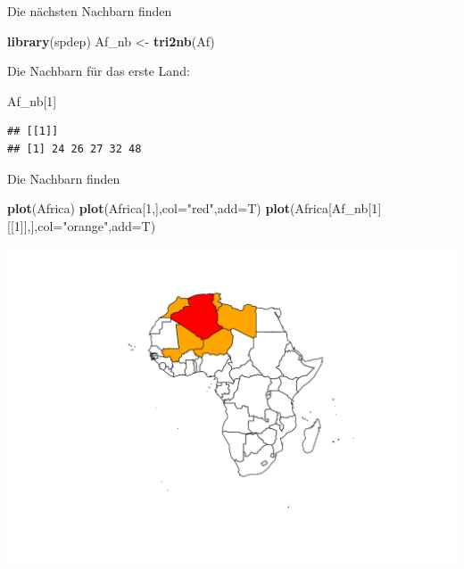\documentclass[ignorenonframetext,]{beamer}
\newenvironment{Shaded}{\begin{snugshade}}{\end{snugshade}}
\newcommand{\DataTypeTok}[1]{\textcolor[rgb]{0.13,0.29,0.53}{#1}}
\newcommand{\DecValTok}[1]{\textcolor[rgb]{0.00,0.00,0.81}{#1}}
\newcommand{\KeywordTok}[1]{\textcolor[rgb]{0.13,0.29,0.53}{\textbf{#1}}}
\newcommand{\NormalTok}[1]{#1}
\newcommand{\StringTok}[1]{\textcolor[rgb]{0.31,0.60,0.02}{#1}}
\begin{document}
\begin{frame}[fragile]{Die nächsten Nachbarn finden}
\protect\hypertarget{die-nachsten-nachbarn-finden}{}

\begin{Shaded}
\begin{Highlighting}[]
\KeywordTok{library}\NormalTok{(spdep)}
\NormalTok{Af_nb <-}\StringTok{ }\KeywordTok{tri2nb}\NormalTok{(Af)}
\end{Highlighting}
\end{Shaded}

Die Nachbarn für das erste Land:

\begin{Shaded}
\begin{Highlighting}[]
\NormalTok{Af_nb[}\DecValTok{1}\NormalTok{]}
\end{Highlighting}
\end{Shaded}

\begin{verbatim}
## [[1]]
## [1] 24 26 27 32 48
\end{verbatim}

\end{frame}

\begin{frame}[fragile]{Die Nachbarn finden}
\protect\hypertarget{die-nachbarn-finden}{}

\begin{Shaded}
\begin{Highlighting}[]
\KeywordTok{plot}\NormalTok{(Africa)}
\KeywordTok{plot}\NormalTok{(Africa[}\DecValTok{1}\NormalTok{,],}\DataTypeTok{col=}\StringTok{"red"}\NormalTok{,}\DataTypeTok{add=}\NormalTok{T)}
\KeywordTok{plot}\NormalTok{(Africa[Af_nb[}\DecValTok{1}\NormalTok{][[}\DecValTok{1}\NormalTok{]],],}\DataTypeTok{col=}\StringTok{"orange"}\NormalTok{,}\DataTypeTok{add=}\NormalTok{T)}
\end{Highlighting}
\end{Shaded}

\includegraphics{A7_spdep_files/figure-beamer/unnamed-chunk-15-1.pdf}

\end{frame}
\end{document}
